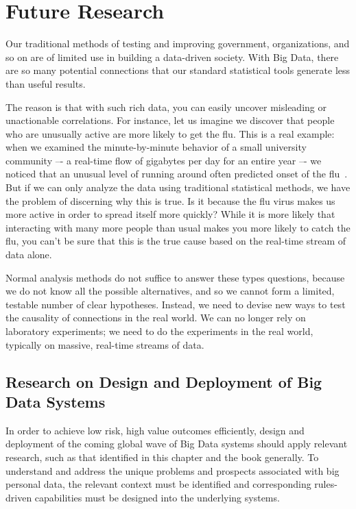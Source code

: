 \section{Future Research }

Our traditional methods of testing and improving government, organizations, and so on are of limited use in building a data-driven society.  With Big Data, there are so many potential connections that our standard statistical tools generate less than useful results.  

The reason is that with such rich data, you can easily uncover misleading or unactionable correlations.
For instance, let us imagine we discover that people who are unusually active are more likely to get the flu.
This is a real example: when we examined the minute-by-minute behavior of a small university community –- a real-time flow of gigabytes per day for an entire year –- we noticed that an unusual level of running around often predicted onset of the flu~\cite{madan2010social}.
But if we can only analyze the data using traditional statistical methods, we have the problem of discerning why this is true.
Is it because the flu virus makes us more active in order to spread itself more quickly?
While it is more likely that interacting with many more people than usual makes you more likely to catch the flu, you can't be sure that this is the true cause based on the real-time stream of data alone.

Normal analysis methods do not suffice to answer these types questions, because we do not know all the possible alternatives, and so we cannot form a limited, testable number of clear hypotheses.
Instead, we need to devise new ways to test the causality of connections in the real world.
We can no longer rely on laboratory experiments; we need to do the experiments in the real world, typically on massive, real-time streams of data.

\subsection{Research on Design and Deployment of Big Data Systems}

In order to achieve low risk, high value outcomes efficiently, design and deployment of the coming global wave of Big Data systems should apply relevant research, such as that identified in this chapter and the book generally.
To understand and address the unique problems and prospects associated with big personal data, the relevant context must be identified and corresponding rules-driven capabilities must be designed into the underlying systems.

